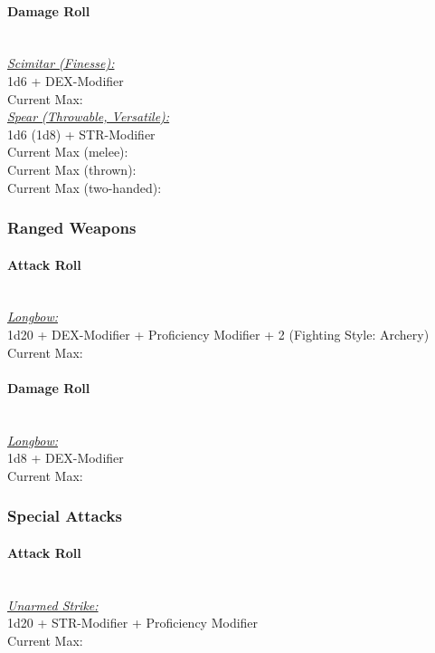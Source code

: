 \documentclass[letterpaper,openany,oneside,twocolumn]{book}
\begin{document}
\paragraph*{Damage Roll}\hfill\\
\underline{\textit{Scimitar (Finesse):}}\\
1d6 + DEX-Modifier\\
\indent Current Max: 
\\
\underline{\textit{Spear (Throwable, Versatile):}}\\
1d6 (1d8) + STR-Modifier\\
\indent Current Max (melee): \\
\indent Current Max (thrown): \\
\indent Current Max (two-handed): 
\subsubsection*{Ranged Weapons}
\paragraph*{Attack Roll}\hfill\\
\underline{\textit{Longbow:}}\\
1d20 + DEX-Modifier + Proficiency Modifier + 2 (Fighting Style: Archery)\\
\indent Current Max: 
\paragraph*{Damage Roll}\hfill\\
\underline{\textit{Longbow:}}\\
1d8 + DEX-Modifier\\
\indent Current Max: 
\subsubsection*{Special Attacks}
\paragraph*{Attack Roll}\hfill\\
\underline{\textit{Unarmed Strike:}}\\
1d20 + STR-Modifier + Proficiency Modifier\\
\indent Current Max: 
\end{document}
